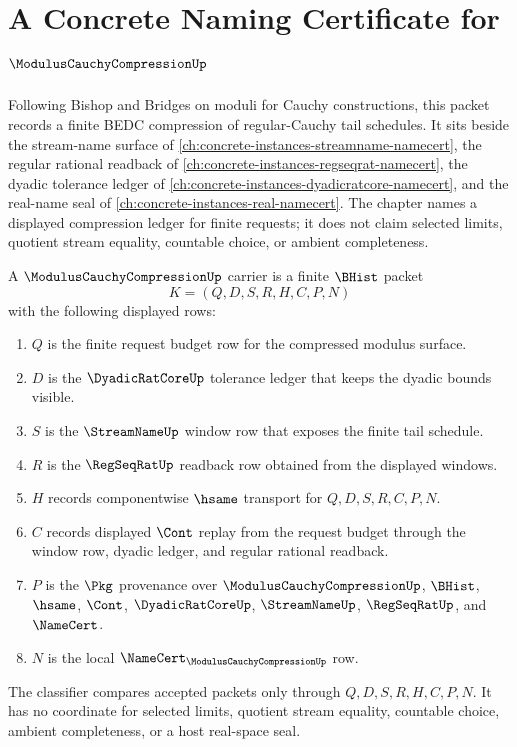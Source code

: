 \chapter{A Concrete Naming Certificate for $\ModulusCauchyCompressionUp$}
\label{ch:concrete-instances-modulus-cauchy-compression-namecert}

Following Bishop and Bridges on moduli for Cauchy constructions, this packet records a finite BEDC compression of regular-Cauchy tail schedules. It sits beside the stream-name surface of \autoref{ch:concrete-instances-streamname-namecert}, the regular rational readback of \autoref{ch:concrete-instances-regseqrat-namecert}, the dyadic tolerance ledger of \autoref{ch:concrete-instances-dyadicratcore-namecert}, and the real-name seal of \autoref{ch:concrete-instances-real-namecert}. The chapter names a displayed compression ledger for finite requests; it does not claim selected limits, quotient stream equality, countable choice, or ambient completeness.

\begin{definition}
\label{def:modulus-cauchy-compression-carrier}
A $\ModulusCauchyCompressionUp$ carrier is a finite $\BHist$ packet
$$
K=(Q,D,S,R,H,C,P,N)
$$
with the following displayed rows:
\begin{enumerate}
\item $Q$ is the finite request budget row for the compressed modulus surface.
\item $D$ is the $\DyadicRatCoreUp$ tolerance ledger that keeps the dyadic bounds visible.
\item $S$ is the $\StreamNameUp$ window row that exposes the finite tail schedule.
\item $R$ is the $\RegSeqRatUp$ readback row obtained from the displayed windows.
\item $H$ records componentwise $\hsame$ transport for $Q,D,S,R,C,P,N$.
\item $C$ records displayed $\Cont$ replay from the request budget through the window row, dyadic ledger, and regular rational readback.
\item $P$ is the $\Pkg$ provenance over $\ModulusCauchyCompressionUp$, $\BHist$, $\hsame$, $\Cont$, $\DyadicRatCoreUp$, $\StreamNameUp$, $\RegSeqRatUp$, and $\NameCert$.
\item $N$ is the local $\NameCert_{\ModulusCauchyCompressionUp}$ row.
\end{enumerate}
The classifier compares accepted packets only through $Q,D,S,R,H,C,P,N$. It has no coordinate for selected limits, quotient stream equality, countable choice, ambient completeness, or a host real-space seal.
\end{definition}

